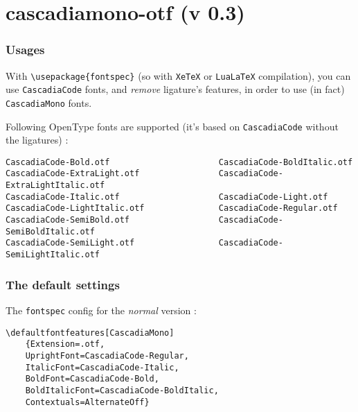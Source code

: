 \documentclass{article}
\begin{document}
\part*{cascadiamono-otf (v 0.3)}

\section{Usages}

With \lstinline[language={[latex]TeX},basicstyle=\ttfamily]|\usepackage{fontspec}| (so with \lstinline[language={[latex]TeX},basicstyle=\ttfamily]|XeTeX| or \lstinline[language={[latex]TeX},basicstyle=\ttfamily]|LuaLaTeX| compilation), you can use \texttt{CascadiaCode} fonts, and \textit{remove} ligature's features, in order to use (in fact) \texttt{CascadiaMono} fonts.

\smallskip

Following OpenType fonts are supported (it's based on \texttt{CascadiaCode} without the ligatures) :

\begin{lstlisting}[language={[latex]TeX},basicstyle=\footnotesize\ttfamily,commentstyle=\itshape\color{gray},keywordstyle=\color{magenta},tabsize=4,frame=single]
CascadiaCode-Bold.otf                      CascadiaCode-BoldItalic.otf
CascadiaCode-ExtraLight.otf                CascadiaCode-ExtraLightItalic.otf
CascadiaCode-Italic.otf                    CascadiaCode-Light.otf
CascadiaCode-LightItalic.otf               CascadiaCode-Regular.otf
CascadiaCode-SemiBold.otf                  CascadiaCode-SemiBoldItalic.otf
CascadiaCode-SemiLight.otf                 CascadiaCode-SemiLightItalic.otf
\end{lstlisting}

\section{The default settings}

The \texttt{fontspec} config for the \textit{normal} version :

\begin{lstlisting}[language={[latex]TeX},basicstyle=\footnotesize\ttfamily,commentstyle=\itshape\color{gray},keywordstyle=\color{magenta},tabsize=4,frame=single]
\defaultfontfeatures[CascadiaMono]
    {Extension=.otf,
    UprightFont=CascadiaCode-Regular,
    ItalicFont=CascadiaCode-Italic,
    BoldFont=CascadiaCode-Bold,
    BoldItalicFont=CascadiaCode-BoldItalic,
    Contextuals=AlternateOff}
\end{lstlisting}
\end{document}
